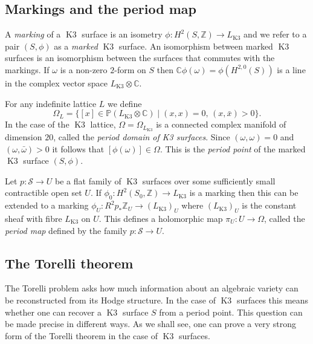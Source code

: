\documentclass[a4paper,11pt]{article}
\newcommand{\CC}{\mathbb C}
\newcommand{\PP}{\mathbb P}
\newcommand{\ZZ}{\mathbb Z}
\newcommand{\cS}{\mathcal S}
\newcommand{\Kthree}{\mathop{\mathrm {K3}}\nolimits}
\begin{document}
\subsection{Markings and the period map}\label{subsect:markings}

A \emph{marking} of a $\Kthree$ surface is an isometry $\phi\colon
H^2(S, \ZZ) \to L_{\Kthree}$ and we refer to a pair $(S,\phi)$ as a
\emph{marked} $\Kthree$ surface. An isomorphism between marked
$\Kthree$ surfaces is an isomorphism between the surfaces that
commutes with the markings. If $\omega$ is a non-zero $2$-form on
$S$ then $\CC \phi(\omega)= \phi(H^{2,0}(S))$ is a line in the complex
vector space $L_{\Kthree}\otimes \CC$.

For any indefinite lattice $L$ we define
\begin{equation}\label{generalperioddomain}
\Omega_L=\{ [x] \in \PP(L_{\Kthree} \otimes \CC) \mid (x,x)=0, \,
(x,\bar{x}) >0 \}.
\end{equation}
In the case of the $\Kthree$ lattice, $\Omega=\Omega_{L_{\Kthree}}$ is a
connected complex manifold of dimension $20$, called the \emph{period
  domain of K3 surfaces}.  Since $(\omega,\omega)=0$ and
$(\omega,\bar{\omega})>0$ it follows that $[\phi(\omega)] \in
\Omega$. This is the \emph{period point} of the marked $\Kthree$
surface $(S,\phi)$.

Let $p\colon \cS \to U$ be a flat family of $\Kthree$ surfaces over
some sufficiently small contractible open set $U$.  If $\phi_0 \colon
H^2(S_0,\ZZ) \to L_{\Kthree}$ is a marking then this can be extended
to a marking $\phi_U \colon R^2p_{*} \ZZ_U \to (L_{\Kthree})_U$ where
$(L_{\Kthree})_U$ is the constant sheaf with fibre $L_{\Kthree}$ on
$U$. This defines a holomorphic map $\pi_U\colon U \to \Omega$, called
the \emph{period map} defined by the family $p\colon \cS \to U$.

\subsection{The Torelli theorem}\label{subsect:K3torelli}

The Torelli problem asks how much information about an algebraic
variety can be reconstructed from its Hodge structure.  In the case of
$\Kthree$ surfaces this means whether one can recover a $\Kthree$
surface $S$ from a period point.  This question can be made precise in
different ways. As we shall see, one can prove a very strong form of
the Torelli theorem in the case of $\Kthree$ surfaces.
\end{document}
